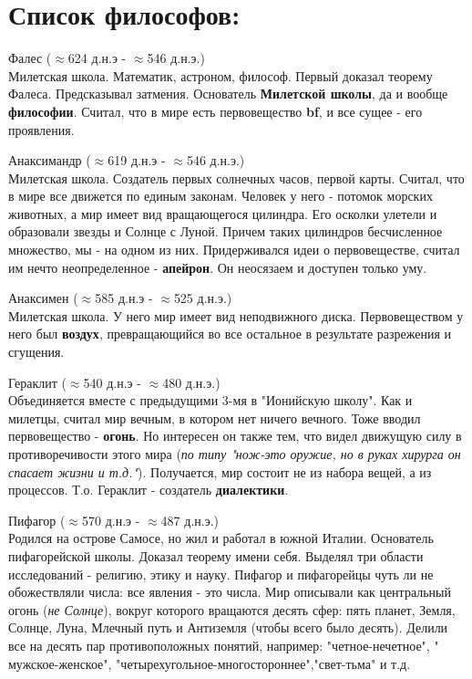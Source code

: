 \documentclass[12pt,a4paper]{article}
\begin{document}
\section{Список философов:}
Фалес ($\approx$624 д.н.э - $\approx$546 д.н.э.)\\
Милетская школа. Математик, астроном, философ. Первый доказал теорему Фалеса. Предсказывал затмения. Основатель \textbf{Милетской школы}, да и вообще \textbf{философии}. Считал, что в мире есть первовещество \textbf{bf}, и все сущее - его проявления.

Анаксимандр ($\approx$619 д.н.э - $\approx$546 д.н.э.)\\
Милетская школа. Создатель первых солнечных часов, первой карты. Считал, что в мире все движется по единым законам. Человек у него - потомок морских животных, а мир имеет вид вращающегося цилиндра. Его осколки улетели и образовали звезды и Солнце с Луной. Причем таких цилиндров бесчисленное множество, мы - на одном из них. Придерживался идеи о первовеществе, считал им нечто неопределенное - \textbf{апейрон}. Он неосязаем и доступен только уму.

Анаксимен ($\approx$585 д.н.э - $\approx$525 д.н.э.)\\
Милетская школа. У него мир имеет вид неподвижного диска. Первовеществом у него был \textbf{воздух}, превращающийся во все остальное в результате разрежения и сгущения.

Гераклит ($\approx$540 д.н.э - $\approx$480 д.н.э.)\\
Объединяется вместе с предыдущими 3-мя в "Ионийскую школу". Как и милетцы, считал мир вечным, в котором нет ничего вечного. Тоже вводил первовещество -  \textbf{огонь}. Но интересен он также тем, что видел движущую силу в противоречивости этого мира (\textit{по типу "нож-это оружие, но в руках хирурга он спасает жизни и т.д."}). Получается, мир состоит не из набора вещей, а из процессов. Т.о. Гераклит - создатель \textbf{диалектики}. 

Пифагор ($\approx$570 д.н.э - $\approx$487 д.н.э.)\\
Родился на острове Самосе, но жил и работал в южной Италии. Основатель пифагорейской школы. Доказал теорему имени себя. Выделял три области исследований - религию, этику и науку. Пифагор и пифагорейцы чуть ли не обожествляли числа: все явления - это числа. Мир описывали как центральный огонь (\textit{не Солнце}), вокруг которого вращаются десять сфер: пять планет, Земля, Солнце, Луна, Млечный путь и Антиземля (чтобы всего было десять). Делили все на десять пар противоположных понятий, например: "четное-нечетное", " мужское-женское", "четырехугольное-многостороннее","свет-тьма" и т.д.
\end{document}
